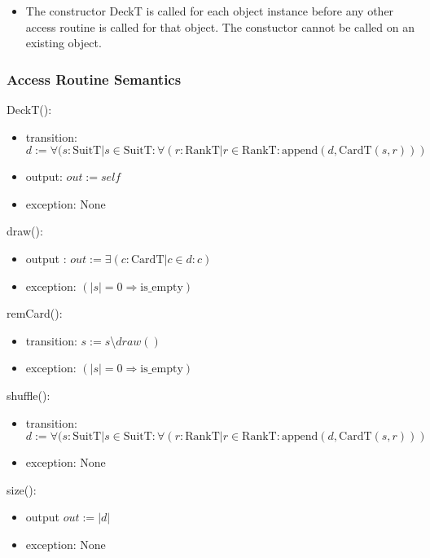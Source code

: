 \documentclass[12pt]{article}
\newcommand{\means}{\Rightarrow}
\begin{document}
\begin{itemize}
    \item The constructor DeckT is called for each object instance before
    any other access routine is called for that object. The constuctor
    cannot be called on an existing object.
\end{itemize}

\subsubsection* {Access Routine Semantics}

DeckT():
\begin{itemize}
    \item transition: $d := \forall (s : \mbox{SuitT} | s \in \mbox{SuitT} : \forall (r : \mbox{RankT} | r \in \mbox{RankT} : \mbox{append}(d,\mbox{CardT}(s,r)))$
    \item output: $out := \mathit{self}$
    \item exception: None
\end{itemize}

\noindent draw():
\begin{itemize}
    \item output : $out := \exists(c : \mbox{CardT} | c \in d : c)$
    \item exception: $(|s| = 0 \means \mbox{is\_empty})$
\end{itemize}

\noindent remCard():
\begin{itemize}
  \item transition: $s := s $\textbackslash$ draw()$
  \item exception: $(|s| = 0 \means \mbox{is\_empty})$
\end{itemize}

\noindent shuffle():
\begin{itemize}
    \item transition: $d := \forall (s : \mbox{SuitT} | s \in \mbox{SuitT} : \forall (r : \mbox{RankT} | r \in \mbox{RankT} : \mbox{append}(d,\mbox{CardT}(s,r)))$
    \item exception: None
\end{itemize}

\noindent size():
\begin{itemize}
    \item output $out := |d|$
    \item exception: None
\end{itemize}
\end{document}
